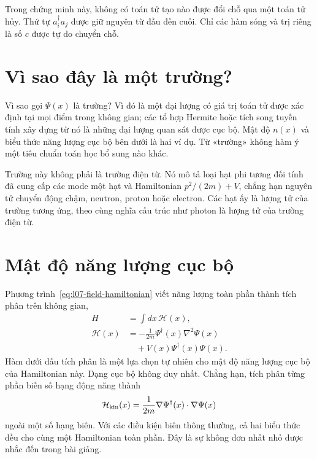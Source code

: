 Trong chứng minh này, không có toán tử tạo nào được đổi chỗ qua một toán tử hủy. Thứ tự \(a_i^\dagger a_j\) được giữ nguyên từ đầu đến cuối. Chỉ các hàm sóng và trị riêng là số \(c\) được tự do chuyển chỗ.

\section{Vì sao đây là một trường?}

Vì sao gọi \(\Psi(x)\) là trường? Vì đó là một đại lượng có giá trị toán tử được xác định tại mọi điểm trong không gian; các tổ hợp Hermite hoặc tích song tuyến tính xây dựng từ nó là những đại lượng quan sát được cục bộ. Mật độ \(n(x)\) và biểu thức năng lượng cục bộ bên dưới là hai ví dụ. Từ «trường» không hàm ý một tiêu chuẩn toán học bổ sung nào khác.

Trường này không phải là trường điện từ. Nó mô tả loại hạt phi tương đối tính đã cung cấp các mode một hạt và Hamiltonian \(p^2/(2m)+V\), chẳng hạn nguyên tử chuyển động chậm, neutron, proton hoặc electron. Các hạt ấy là lượng tử của trường tương ứng, theo cùng nghĩa cấu trúc như photon là lượng tử của trường điện từ.

\begin{classroomqa}
\end{classroomqa}

\section{Mật độ năng lượng cục bộ}

Phương trình~\eqref{eq:l07-field-hamiltonian} viết năng lượng toàn phần thành tích phân trên không gian,
\begin{equation}
\begin{aligned}
H&=\int dx\,\mathcal H(x),\\
\mathcal H(x)
&=-\frac{1}{2m}\Psi^\dagger(x)\nabla^2\Psi(x)\\
&\quad+V(x)\Psi^\dagger(x)\Psi(x).
\end{aligned}
\label{eq:l07-hamiltonian-density}
\end{equation}
Hàm dưới dấu tích phân là một lựa chọn tự nhiên cho mật độ năng lượng cục bộ của Hamiltonian này. Dạng cục bộ không duy nhất. Chẳng hạn, tích phân từng phần biến số hạng động năng thành
\begin{equation}
\mathcal H_{\rm kin}(x)
=\frac{1}{2m}\nabla\Psi^\dagger(x)\mathbin{\cdot}\nabla\Psi(x)
\label{eq:l07-kinetic-density}
\end{equation}
ngoài một số hạng biên. Với các điều kiện biên thông thường, cả hai biểu thức đều cho cùng một Hamiltonian toàn phần. Đây là sự không đơn nhất nhỏ được nhắc đến trong bài giảng.

